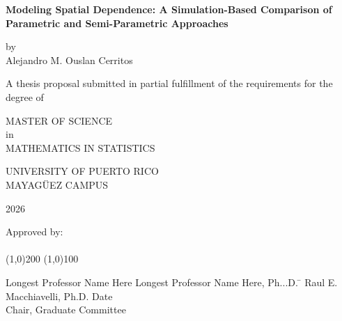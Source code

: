 \begin{titlepage}


\thispagestyle{empty}
\begin{center}
\begin{singlespace}
\textbf{Modeling Spatial Dependence: A Simulation-Based Comparison of Parametric and Semi-Parametric Approaches}
\end{singlespace}
\vspace{4 mm}
by
\\
\vspace{4 mm}
Alejandro M. Ouslan Cerritos %
\vspace{4 mm}
\begin{singlespace}
A thesis proposal submitted in partial fulfillment of the requirements for the degree of %
\end{singlespace}
\vspace{4 mm}
MASTER OF SCIENCE %
\\
in
\\
MATHEMATICS IN STATISTICS %
\\
\vspace{4 mm}
\begin{singlespace}

UNIVERSITY OF PUERTO RICO
\\
MAYAG\"UEZ CAMPUS
\end{singlespace}

2026 %
\end{center}
\bigskip
\bigskip
\bigskip
\bigskip
\bigskip
\bigskip
\bigskip
\bigskip
\bigskip
\bigskip
\bigskip
\bigskip
\bigskip
\bigskip
\bigskip
\bigskip
\bigskip
\bigskip
\bigskip
\bigskip
\bigskip
\bigskip
\bigskip
\bigskip
\bigskip
\bigskip
\bigskip
\bigskip
\bigskip
\bigskip
\bigskip
\bigskip


  \noindent Approved by:
\\
\\
  \noindent
\line(1,0){200} \hspace{40 mm} \line(1,0){100}\\
  \noindent
\vspace{-1.75\baselineskip}
  \begin{tabbing}
Longest Professor Name Here Longest Professor Name Here, Ph...D. \=  \kill 
Raul E. Macchiavelli, Ph.D. \>  Date\\Chair, Graduate Committee  %
\end{tabbing}



\end{titlepage}
